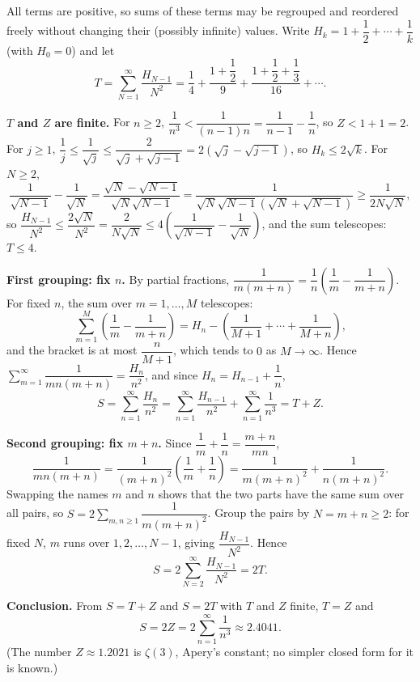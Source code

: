 All terms are positive, so sums of these terms may be regrouped and reordered freely without changing their (possibly infinite) values. Write $H_k=1+\dfrac12+\cdots+\dfrac1k$ (with $H_0=0$) and let
\[T=\sum_{N=1}^{\infty}\dfrac{H_{N-1}}{N^2}=\dfrac{1}{4}+\dfrac{1+\dfrac12}{9}+\dfrac{1+\dfrac12+\dfrac13}{16}+\cdots.\]

\textbf{$T$ and $Z$ are finite.} For $n\ge2$, $\dfrac1{n^3}<\dfrac{1}{(n-1)n}=\dfrac1{n-1}-\dfrac1n$, so $Z<1+1=2$. For $j\ge1$, $\dfrac1j\le\dfrac1{\sqrt j}\le\dfrac{2}{\sqrt j+\sqrt{j-1}}=2\left(\sqrt j-\sqrt{j-1}\right)$, so $H_k\le2\sqrt k$. For $N\ge2$,
\[\dfrac1{\sqrt{N-1}}-\dfrac1{\sqrt N}=\dfrac{\sqrt N-\sqrt{N-1}}{\sqrt N\sqrt{N-1}}=\dfrac{1}{\sqrt N\sqrt{N-1}\left(\sqrt N+\sqrt{N-1}\right)}\ge\dfrac{1}{2N\sqrt N},\]
so $\dfrac{H_{N-1}}{N^2}\le\dfrac{2\sqrt N}{N^2}=\dfrac{2}{N\sqrt N}\le4\left(\dfrac1{\sqrt{N-1}}-\dfrac1{\sqrt N}\right)$, and the sum telescopes: $T\le4$.

\textbf{First grouping: fix $n$.} By partial fractions, $\dfrac{1}{m(m+n)}=\dfrac1n\left(\dfrac1m-\dfrac1{m+n}\right)$. For fixed $n$, the sum over $m=1,\dots,M$ telescopes:
\[\sum_{m=1}^{M}\left(\dfrac1m-\dfrac1{m+n}\right)=H_n-\left(\dfrac1{M+1}+\cdots+\dfrac1{M+n}\right),\]
and the bracket is at most $\dfrac{n}{M+1}$, which tends to $0$ as $M\to\infty$. Hence $\displaystyle\sum_{m=1}^{\infty}\dfrac{1}{mn(m+n)}=\dfrac{H_n}{n^2}$, and since $H_n=H_{n-1}+\dfrac1n$,
\[S=\sum_{n=1}^{\infty}\dfrac{H_n}{n^2}=\sum_{n=1}^{\infty}\dfrac{H_{n-1}}{n^2}+\sum_{n=1}^{\infty}\dfrac1{n^3}=T+Z.\]

\textbf{Second grouping: fix $m+n$.} Since $\dfrac1m+\dfrac1n=\dfrac{m+n}{mn}$,
\[\dfrac{1}{mn(m+n)}=\dfrac{1}{(m+n)^2}\left(\dfrac1m+\dfrac1n\right)=\dfrac{1}{m(m+n)^2}+\dfrac{1}{n(m+n)^2}.\]
Swapping the names $m$ and $n$ shows that the two parts have the same sum over all pairs, so $S=2\displaystyle\sum_{m,n\ge1}\dfrac{1}{m(m+n)^2}$. Group the pairs by $N=m+n\ge2$: for fixed $N$, $m$ runs over $1,2,\dots,N-1$, giving $\dfrac{H_{N-1}}{N^2}$. Hence
\[S=2\sum_{N=2}^{\infty}\dfrac{H_{N-1}}{N^2}=2T.\]

\textbf{Conclusion.} From $S=T+Z$ and $S=2T$ with $T$ and $Z$ finite, $T=Z$ and
\[S=\boxed{2Z=2\sum_{n=1}^{\infty}\dfrac1{n^3}}\approx2.4041.\]
(The number $Z\approx1.2021$ is $\zeta(3)$, Apery's constant; no simpler closed form for it is known.)
